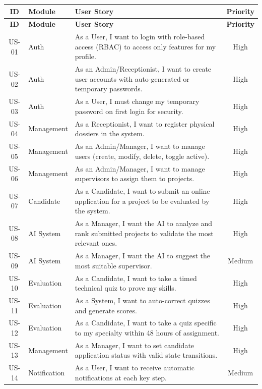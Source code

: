 \begin{longtable}{|c|p{2.5cm}|p{8cm}|c|}
\hline
\rowcolor{gray!20}
\textbf{ID} & \textbf{Module} & \textbf{User Story} & \textbf{Priority} \\
\hline
\endfirsthead

\hline
\rowcolor{gray!20}
\textbf{ID} & \textbf{Module} & \textbf{User Story} & \textbf{Priority} \\
\hline
\endhead

US-01 & Auth & As a User, I want to login with role-based access (RBAC) to access only features for my profile. & High \\
\hline
US-02 & Auth & As an Admin/Receptionist, I want to create user accounts with auto-generated or temporary passwords. & High \\
\hline
US-03 & Auth & As a User, I must change my temporary password on first login for security. & High \\
\hline
US-04 & Management & As a Receptionist, I want to register physical dossiers in the system. & High \\
\hline
US-05 & Management & As an Admin/Manager, I want to manage users (create, modify, delete, toggle active). & High \\
\hline
US-06 & Management & As an Admin/Manager, I want to manage supervisors to assign them to projects. & High \\
\hline
US-07 & Candidate & As a Candidate, I want to submit an online application for a project to be evaluated by the system. & High \\
\hline
US-08 & AI System & As a Manager, I want the AI to analyze and rank submitted projects to validate the most relevant ones. & High \\
\hline
US-09 & AI System & As a Manager, I want the AI to suggest the most suitable supervisor. & Medium \\
\hline
US-10 & Evaluation & As a Candidate, I want to take a timed technical quiz to prove my skills. & High \\
\hline
US-11 & Evaluation & As a System, I want to auto-correct quizzes and generate scores. & High \\
\hline
US-12 & Evaluation & As a Candidate, I want to take a quiz specific to my specialty within 48 hours of assignment. & High \\
\hline
US-13 & Management & As a Manager, I want to set candidate application status with valid state transitions. & High \\
\hline
US-14 & Notification & As a User, I want to receive automatic notifications at each key step. & Medium \\

\end{longtable}
